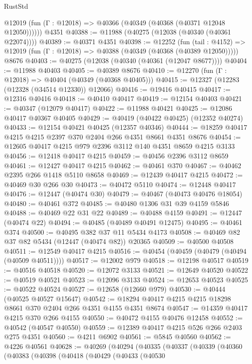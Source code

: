 \begin{lexlean}{RustStd}
\begin{coremodule}
      @12019 (fun (Γ : @12018) => @40366 (@40349 (@40368 (@40371 @12048 @12050))))))
    @4351
@40388 := @11988 (@40275 (@12038 (@40340 (@40361 @22074))))
@40389 := @40371 @4351
@40398 := @12252
    (fun (tail : @4152) => @12019 (fun (Γ : @12018) => @40388 (@40349 (@40368 (@40389 @12050)))))
    @8676
@40403 := @40275 (@12038 (@40340 (@40361 (@12047 @8677))))
@40404 := @11988 @40403
@40405 := @40389 @8676
@40410 := @12270 (fun (Γ : @12018) => @40404 (@40349 (@40368 @40405)))
@40415 := @12327 (@12283 (@12328 (@34514 @12330)) @12066)
@40416 := @19416 @40415
@40417 := @12316 @40416
@40418 := @40410 @40417
@40419 := @12154 @40403
@40421 := @40347 (@12079 @40417)
@40422 := @11988 @40421
@40425 := @12086 @40417 @40367 @40405
@40429 := @40419 (@40422 @40425) (@12352 @40274)
@40433 := @12154 @40421 @40425 (@12357 @40346)
@40444 := @18259 @40417 @4215 @4215 @2397 @370 @2404 @266 @4351 @8661 @4351 @8676
@40454 := @12605 @40417 @4215 @979 @2396 @3112 @140 @4351 @8659 @4215 @3133
@40456 := @12418 @40417 @4215
@40459 := @40456 @2396 @3112 @8659
@40461 := @12427 @40417 @4215
@40462 := @40461 @370
@40467 := @40462 @2395 @266 @1418 @5110 @8658
@40469 := @12439 @40417 @4215
@40472 := @40469 @30 @266 @30
@40473 := @40472 @5110
@40474 := @12448 @40417
@40476 := @12447 (@40474 @30)
@40479 := @40467 (@40473 @40476 @18054)
@40480 := @40461 @372
@40485 := @40480 @1306 @31 @39 @4159 @5846
@40488 := @40469 @22 @31 @22
@40489 := @40488 @4159
@40491 := @12447 (@40474 @22)
@40494 := @40485 (@40489 @40491 @12475)
@40495 := @40461 @374
@40500 := @40495 @382 @37 @11 @5434 @4173
@40508 := @40469 @82 @37 @82 @5434 (@12447 (@40474 @82)) @20365
@40509 := @40500 @40508
@40511 := @12549 @40417 @4215
@40516 := @40454 (@40459 (@40479 (@40494 (@40509 @40511))))
@40517 := @12002 @979
@40518 := @12198 @40517
@40519 := @40516 @40518
@40520 := @12072 @3133
@40521 := @12649 @40520
@40522 := @40519 @40521
@40523 := @12096 @3133
@40524 := @12653 @40523
@40525 := @40522 @40524
@40527 := @12658 (@12660 @979)
@40530 := @40444 (@40525 @40527 @15647)
@40542 := @18294 @40417 @4215 @4215 @18298 @8661 @370 @2404 @266 @4351 @4155 @4351 @8674
@40547 := @14359 @40417 @4215 @370 @266 @4155
@40550 := @40472 @4155 @40476 @12458
@40552 := @40542 (@40547 @40550)
@40559 := @12389 @40417 @4215 @526 @266 @2403 @275 @4351
@40560 := @4211 @6902
@40561 := @5845 @40560
@40562 := @4226 @40561
@40628 := @40269
    (@40294
      (@40335
        (@40337
          (@40339
            (@40360
              (@40383
                (@40398
                  (@40418
                    (@40429
                      (@40433
                        (@40530

\end{coremodule}
\end{lexlean}

